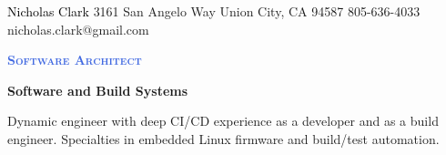\documentclass[letterpaper, 10pt]{article}
\newcommand{\NrcColorName}{Black}
\newcommand{\NrcColorTitle}{RoyalBlue}
\begin{document}
%
\nrctitle
{\textcolor{\NrcColorName}{Nicholas Clark}}
{3161 San Angelo Way}
{Union City, CA 94587}
{805-636-4033}
{nicholas.clark@gmail.com}
%
\begin{center}\par\smallskip
\textcolor{\NrcColorTitle}{\Large \textbf{\textsc{Software Architect}}}\par
\large \textbf{{Software and Build Systems}}\par
\smallskip
\noindent \begin{minipage}[t]{0.75\textwidth}%
\begin{center}
Dynamic engineer with deep CI/CD experience as a developer and as a build
engineer. Specialties in embedded Linux firmware and build/test automation.
\end{center}
\end{minipage}
\end{center}
\par \smallskip \smallskip
%
%
\end{document}
